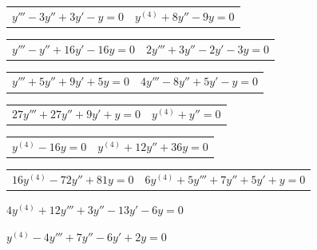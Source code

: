 \begin{exerciselist}
  \begin{tabular}[t]{@{}p{168pt}@{}p{168pt}}
    \item\label{exer:9.2.1} $y'''-3y''+3y'-y=0$ & \vspace*{9pt}
    \item\label{exer:9.2.2} $y^{(4)}+8y''-9y=0$
  \end{tabular}

  \begin{tabular}[t]{@{}p{168pt}@{}p{168pt}}
    \item\label{exer:9.2.3} $y'''-y''+16y'-16y=0$ &
    \item\label{exer:9.2.4} $2y'''+3y''-2y'-3y=0$
  \end{tabular}

  \begin{tabular}[t]{@{}p{168pt}@{}p{168pt}}
    \item\label{exer:9.2.5} $y'''+5y''+9y'+5y=0$ &
    \item\label{exer:9.2.6} $4y'''-8y''+5y'-y=0$
  \end{tabular}

  \begin{tabular}[t]{@{}p{168pt}@{}p{168pt}}
    \item\label{exer:9.2.7} $27y'''+27y''+9y'+y=0$ &
    \item\label{exer:9.2.8} $y^{(4)}+y''=0$
  \end{tabular}

  \begin{tabular}[t]{@{}p{168pt}@{}p{168pt}}
    \item\label{exer:9.2.9} $y^{(4)}-16y=0$ &
    \item\label{exer:9.2.10} $y^{(4)}+12y''+36y=0$
  \end{tabular}

  \begin{tabular}[t]{@{}p{168pt}@{}p{168pt}}
    \item\label{exer:9.2.11} $16y^{(4)}-72y''+81y=0$ &
    \item\label{exer:9.2.12} $6y^{(4)}+5y'''+7y''+5y'+y=0$
  \end{tabular}

  \item\label{exer:9.2.13} $4y^{(4)}+12y'''+3y''-13y'-6y=0$

  \item\label{exer:9.2.14} $y^{(4)}-4y'''+7y''-6y'+2y=0$



\end{exerciselist}
